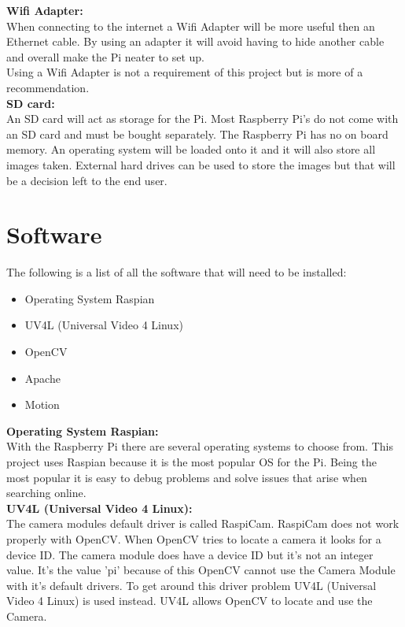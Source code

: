 \documentclass[]{report}   %
\begin{document}
{\bf Wifi Adapter:}\\
When connecting to the internet a Wifi Adapter will be more useful then an Ethernet cable. By using an adapter it will avoid having to hide another cable and overall make the Pi neater to set up.\\

Using a Wifi Adapter is not a requirement of this project but is more of a recommendation.\\

{\bf SD card:}\\
An SD card will act as storage for the Pi. Most Raspberry Pi's do not come with an SD card and must be bought separately. The Raspberry Pi has no on board memory. An operating system will be loaded onto it and it will also store all images taken. External hard drives can be used to store the images but that will be a decision left to the end user.\\


\section {Software}	
\label {sec:software}	
The following is a list of all the software that will need to be installed:
\begin {itemize}
  \item Operating System Raspian 
  \item UV4L (Universal Video 4 Linux)  
  \item OpenCV
  \item Apache
  \item Motion
\end {itemize}

{\bf Operating System Raspian:}\\

With the Raspberry Pi there are several operating systems to choose from. This project uses Raspian because it is the most popular OS for the Pi. Being the most popular it is easy to debug problems and solve issues that arise when searching online.\\ 


{\bf UV4L (Universal Video 4 Linux):}\\

The camera modules default driver is called RaspiCam. RaspiCam does not work properly with OpenCV. When OpenCV tries to locate a camera it looks for a device ID. The camera module does have a device ID but it's not an integer value. It's the value 'pi' because of this OpenCV cannot use the Camera Module with it's default drivers. To get around this driver problem UV4L (Universal Video 4 Linux) is used instead. UV4L allows OpenCV to locate and use the Camera.
\end{document}
